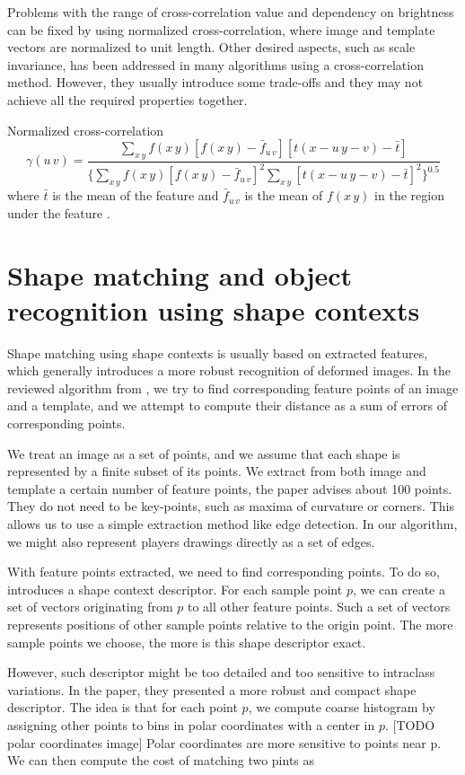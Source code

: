 \begin{description}
Problems with the range of cross-correlation value and dependency on brightness can be fixed by using normalized cross-correlation, where image and template vectors are normalized to unit length. Other desired aspects, such as scale invariance, has been addressed in many algorithms using a cross-correlation method. However, they usually introduce some trade-offs and they may not achieve all the required properties together. 

Normalized cross-correlation
\begin{equation*}
\gamma(u\,v) = \frac{\sum_{x\,y}f(x\,y) [f(x\,y)-\bar{f}_{u\,v}][t(x-u\,y-v)-\bar{t}]} {\{ \sum_{x\,y}f(x\,y) [f(x\,y)-\bar{f}_{u\,v}]^2 \sum_{x\,y}[t(x-u\,y-v)-\bar{t}]^2  \}^{0.5}}
\end{equation*}
where $\bar{t}$ is the mean of the feature and $\bar{f}_{u\,v}$ is the mean of $f(x\,y)$ in the region under the feature \cite{crossCorrLewis}.

\section{Shape matching and object recognition using shape contexts}
Shape matching using shape contexts is usually based on extracted features, which generally introduces a more robust recognition of deformed images. In the reviewed algorithm from , we try to find corresponding feature points of an image and a template, and we attempt to compute their distance as a sum of errors of corresponding points.

We treat an image as a set of points, and we assume that each shape is represented by a finite subset of its points. We extract from both image and template a certain number of feature points, the paper advises about 100 points. They do not need to be key-points, such as maxima of curvature or corners. This allows us to use a simple extraction method like edge detection. In our algorithm, we might also represent players drawings directly as a set of edges. 

With feature points extracted, we need to find corresponding points. To do so, \citet{simple} introduces a shape context descriptor. For each sample point $p$, we can create a set of vectors originating from $p$ to all other feature points. Such a set of vectors represents positions of other sample points relative to the origin point. The more sample points we choose, the more is this shape descriptor exact.

However, such descriptor might be too detailed and too sensitive to intraclass variations. In the paper, they presented a more robust and compact shape descriptor. The idea is that for each point $p$, we compute coarse histogram by assigning other points to bins in polar coordinates with a center in $p$. [TODO polar coordinates image] Polar coordinates are more sensitive to points near p. We can then compute the cost of matching two pints as 


\end{description}
